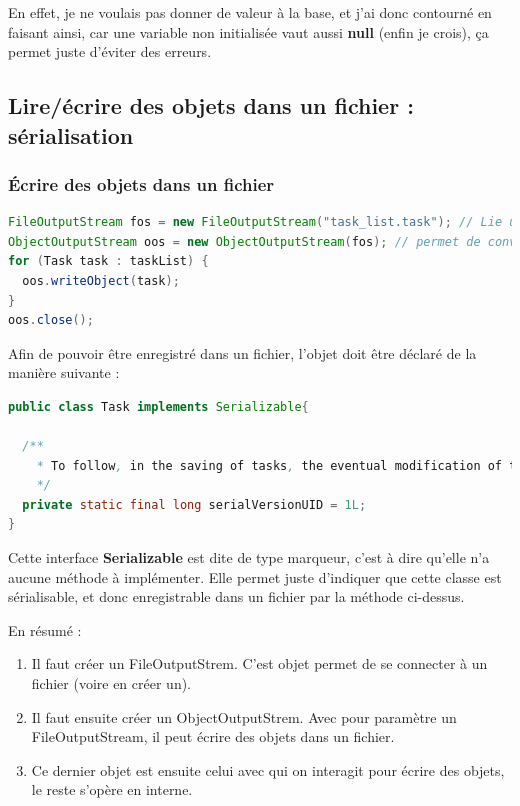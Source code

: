 \documentclass[a4paper,twoside]{article}
\begin{document}
En effet, je ne voulais pas donner de valeur à la base, et j'ai donc contourné en faisant ainsi, car une variable non initialisée vaut aussi \textbf{null} (enfin je crois), ça permet juste d'éviter des erreurs.

\subsection{Lire/écrire des objets dans un fichier : sérialisation}
\subsubsection{Écrire des objets dans un fichier}

\begin{lstlisting}[language=java]
FileOutputStream fos = new FileOutputStream("task_list.task"); // Lie un flux de donnees a un fichier physique
ObjectOutputStream oos = new ObjectOutputStream(fos); // permet de convertir un objet en flux de donnees
for (Task task : taskList) {
  oos.writeObject(task);
}
oos.close();
\end{lstlisting}

\bigskip

Afin de pouvoir être enregistré dans un fichier, l'objet doit être déclaré de la manière suivante :
\begin{lstlisting}[language=java]
public class Task implements Serializable{
  
  /**
    * To follow, in the saving of tasks, the eventual modification of the class itself
    */
  private static final long serialVersionUID = 1L;
}
\end{lstlisting}
Cette interface \textbf{Serializable} est dite de type marqueur, c'est à dire qu'elle n'a aucune méthode à implémenter. Elle permet juste d'indiquer que cette classe est sérialisable, et donc enregistrable dans un fichier par la méthode ci-dessus.

\bigskip

En résumé : 
\begin{enumerate}
\item Il faut créer un FileOutputStrem. C'est objet permet de se connecter à un fichier (voire en créer un).
\item Il faut ensuite créer un ObjectOutputStrem. Avec pour paramètre un FileOutputStream, il peut écrire des objets dans un fichier.
\item Ce dernier objet est ensuite celui avec qui on interagit pour écrire des objets, le reste s'opère en interne.
\end{enumerate}
\end{document}
